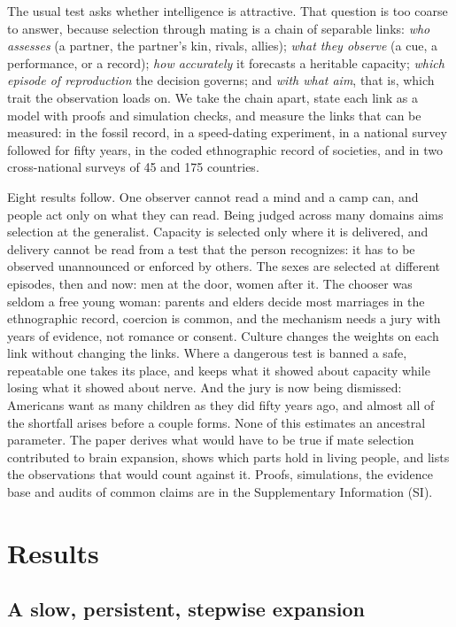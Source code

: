 The usual test asks whether intelligence is attractive. That question is too coarse to answer, because selection through
mating is a chain of separable links: \emph{who assesses} (a partner, the partner's kin, rivals, allies); \emph{what they
observe} (a cue, a performance, or a record); \emph{how accurately} it forecasts a heritable capacity; \emph{which episode
of reproduction} the decision governs; and \emph{with what aim}, that is, which trait the observation loads on. We take the
chain apart, state each link as a model with proofs and simulation checks, and measure the links that can be measured: in
the fossil record, in a speed-dating experiment, in a national survey followed for fifty years, in the coded ethnographic
record of \CcSccsN{} societies, and in two cross-national surveys of 45 and 175 countries.

Eight results follow. One observer cannot read a mind and a camp can, and people act only on what they can read. Being
judged across many domains aims selection at the generalist. Capacity is selected only where it is delivered, and delivery
cannot be read from a test that the person recognizes: it has to be observed unannounced or enforced by others. The sexes
are selected at different episodes, then and now: men at the door, women after it. The chooser was seldom a free young
woman: parents and elders decide most marriages in the ethnographic record, coercion is common, and the mechanism needs a
jury with years of evidence, not romance or consent. Culture changes the weights on each link without changing the links.
Where a dangerous test is banned a safe, repeatable one takes its place, and keeps what it showed about capacity while
losing what it showed about nerve. And the jury is now being dismissed: Americans want as many children as they did fifty
years ago, and almost all of the shortfall arises before a couple forms. None of this estimates an ancestral parameter.
The paper derives what would have to be true if mate selection contributed to brain expansion, shows which parts hold in
living people, and lists the observations that would count against it. Proofs, simulations, the evidence base and audits
of common claims are in the Supplementary Information (SI).

\section{Results}

\subsection{A slow, persistent, stepwise expansion}\label{sec:resfossil}

